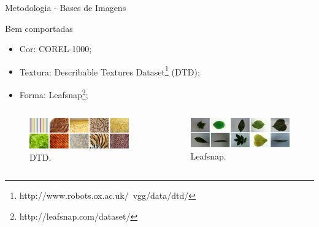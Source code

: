 \documentclass{beamer}
\begin{document}
\begin{frame}{Metodologia - Bases de Imagens}
\setlength\leftmargini{1em}
\begin{block}{Bem comportadas}
\justifying
\begin{itemize}
\item Cor: COREL-1000;
\item Textura: Describable Textures Dataset\footnote{http://www.robots.ox.ac.uk/~vgg/data/dtd/} (DTD);
\item Forma: Leafsnap\footnote{http://leafsnap.com/dataset/};
\end{itemize}
\end{block}
\vspace{1em}
\begin{columns}
  \begin{column}{0.5\textwidth}
    \begin{figure}[hbpt]
      \begin{center}
        \includegraphics[width=\columnwidth]{figuras/texture.png}
      \end{center}
      \caption{DTD.}
    \end{figure}
    \end{column}
  \begin{column}{0.5\textwidth}
    \begin{figure}[hbpt]
      \begin{center}    
        \includegraphics[width=\columnwidth]{figuras/leafs.png}
       \end{center}
      \caption{Leafsnap.}
    \end{figure}
  \end{column}
\end{columns}
\end{frame}
\end{document}

